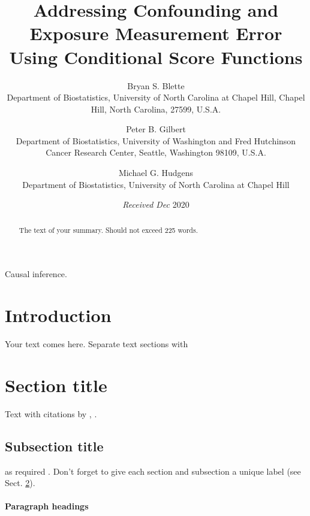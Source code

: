 \documentclass[useAMS,usenatbib,referee]{biom}
\title[]{Addressing Confounding and Exposure Measurement Error Using Conditional
Score Functions}
\author{ Bryan S. Blette \email{\href{mailto:blette@live.unc.edu}{\nolinkurl{blette@live.unc.edu}}} \\ Department of Biostatistics, University of North Carolina at Chapel
Hill, Chapel Hill, North Carolina, 27599, U.S.A.  \and
		 Peter B. Gilbert \email{} \\ Department of Biostatistics, University of Washington and Fred
Hutchinson Cancer Research Center, \newline Seattle, Washington 98109,
U.S.A.  \and
		 Michael G. Hudgens \email{} \\ Department of Biostatistics, University of North Carolina at Chapel Hill 
	   }
\begin{document}
\date{{\it Received Dec} 2020}

\pagerange{\pageref{firstpage}--\pageref{lastpage}} 



\label{firstpage}


\begin{abstract}
The text of your summary. Should not exceed 225 words.
\end{abstract}

%
%

\begin{keywords}
Causal inference.
\end{keywords}

\maketitle

\hypertarget{intro}{%
\section{Introduction}\label{intro}}

Your text comes here. Separate text sections with

\hypertarget{sec:1}{%
\section{Section title}\label{sec:1}}

Text with citations by \citet{heagerty2000time},
\citep{pepe2003statistical}.

\hypertarget{sec:2}{%
\subsection{Subsection title}\label{sec:2}}

as required \citep{hoerl1970ridge, zou2005regularization}. Don't forget
to give each section and subsection a unique label (see Sect.
\ref{sec:1}).

\hypertarget{paragraph-headings}{%
\paragraph{Paragraph headings}\label{paragraph-headings}}
\end{document}
